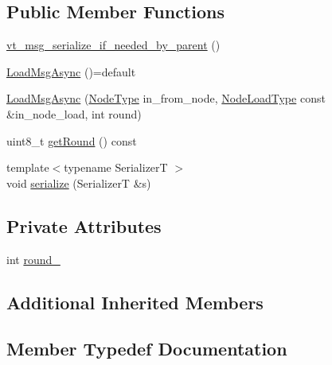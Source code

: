 \subsection*{Public Member Functions}
\begin{DoxyCompactItemize}
\item 
\hyperlink{structvt_1_1vrt_1_1collection_1_1balance_1_1_load_msg_async_ab3a289a0f86f459ffa0e20a52581a0a3}{vt\+\_\+msg\+\_\+serialize\+\_\+if\+\_\+needed\+\_\+by\+\_\+parent} ()
\item 
\hyperlink{structvt_1_1vrt_1_1collection_1_1balance_1_1_load_msg_async_a91dc073228c69d6bccb3ef7a405ac8a9}{Load\+Msg\+Async} ()=default
\item 
\hyperlink{structvt_1_1vrt_1_1collection_1_1balance_1_1_load_msg_async_af40c4eda8057beeef2f027f2bd8eebe9}{Load\+Msg\+Async} (\hyperlink{namespacevt_a866da9d0efc19c0a1ce79e9e492f47e2}{Node\+Type} in\+\_\+from\+\_\+node, \hyperlink{structvt_1_1vrt_1_1collection_1_1balance_1_1_load_msg_a573cc4f6cf58c3160e94a6351a3912d2}{Node\+Load\+Type} const \&in\+\_\+node\+\_\+load, int round)
\item 
uint8\+\_\+t \hyperlink{structvt_1_1vrt_1_1collection_1_1balance_1_1_load_msg_async_a3472cc2414cd4bcca116cdc6432f534c}{get\+Round} () const
\item 
{\footnotesize template$<$typename SerializerT $>$ }\\void \hyperlink{structvt_1_1vrt_1_1collection_1_1balance_1_1_load_msg_async_a4c484a8f9f5537166435f832bfedb708}{serialize} (SerializerT \&s)
\end{DoxyCompactItemize}
\subsection*{Private Attributes}
\begin{DoxyCompactItemize}
\item 
int \hyperlink{structvt_1_1vrt_1_1collection_1_1balance_1_1_load_msg_async_adc179114938252d9cd0c7664b94887ee}{round\+\_\+}
\end{DoxyCompactItemize}
\subsection*{Additional Inherited Members}


\subsection{Member Typedef Documentation}
\mbox{\label{structvt_1_1vrt_1_1collection_1_1balance_1_1_load_msg_async_a6581fa4f51cc442179e9aba1fd3e3bee}} 

